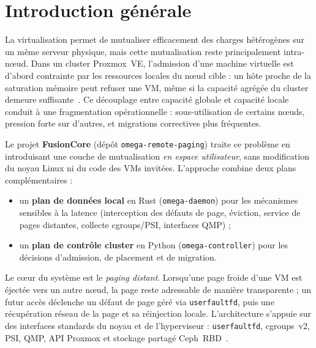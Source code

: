 \chapter*{Introduction générale}
\label{ch:introduction}

La virtualisation permet de mutualiser efficacement des charges hétérogènes sur un même serveur physique, mais cette mutualisation reste principalement intra-nœud. Dans un cluster Proxmox~VE, l’admission d’une machine virtuelle est d’abord contrainte par les ressources locales du nœud cible : un hôte proche de la saturation mémoire peut refuser une VM, même si la capacité agrégée du cluster demeure suffisante~\cite{proxmox_doc}. Ce découplage entre capacité globale et capacité locale conduit à une fragmentation opérationnelle : sous-utilisation de certains nœuds, pression forte sur d’autres, et migrations correctives plus fréquentes.

Le projet \textbf{FusionCore} (dépôt \texttt{omega-remote-paging}) traite ce problème en introduisant une couche de mutualisation \emph{en espace utilisateur}, sans modification du noyau Linux ni du code des VMs invitées. L’approche combine deux plans complémentaires :
\begin{itemize}
    \item un \textbf{plan de données local} en Rust (\texttt{omega-daemon}) pour les mécanismes sensibles à la latence (interception des défauts de page, éviction, service de pages distantes, collecte cgroups/PSI, interfaces QMP) ;
    \item un \textbf{plan de contrôle cluster} en Python (\texttt{omega-controller}) pour les décisions d’admission, de placement et de migration.
\end{itemize}

Le cœur du système est le \emph{paging distant}. Lorsqu’une page froide d’une VM est éjectée vers un autre nœud, la page reste adressable de manière transparente ; un futur accès déclenche un défaut de page géré via \texttt{userfaultfd}, puis une récupération réseau de la page et sa réinjection locale. L’architecture s’appuie sur des interfaces standards du noyau et de l’hyperviseur : \texttt{userfaultfd}, cgroups~v2, PSI, QMP, API Proxmox et stockage partagé Ceph~RBD~\cite{kvm_doc,qemu_doc,ceph_doc}.

